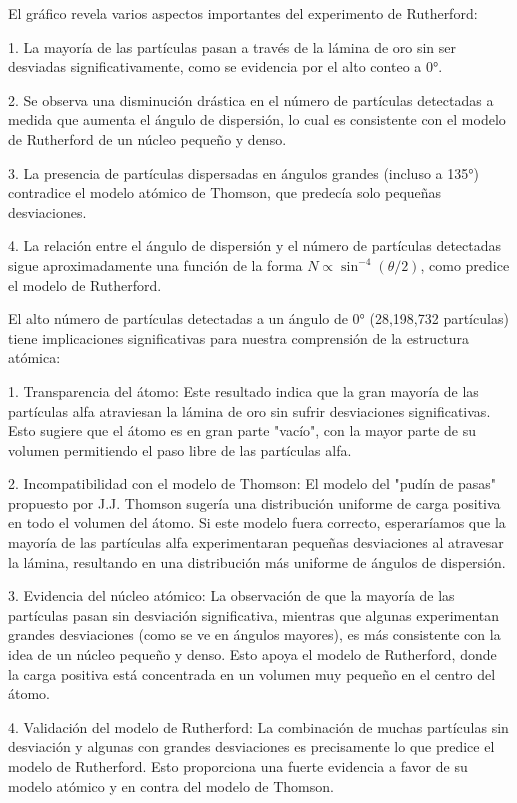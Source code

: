 \documentclass[twocolumn,a4paper,11pt]{scrartcl}
\begin{document}
El gráfico revela varios aspectos importantes del experimento de Rutherford:

1. La mayoría de las partículas pasan a través de la lámina de oro sin ser desviadas significativamente, como se evidencia por el alto conteo a 0°.

2. Se observa una disminución drástica en el número de partículas detectadas a medida que aumenta el ángulo de dispersión, lo cual es consistente con el modelo de Rutherford de un núcleo pequeño y denso.

3. La presencia de partículas dispersadas en ángulos grandes (incluso a 135°) contradice el modelo atómico de Thomson, que predecía solo pequeñas desviaciones.

4. La relación entre el ángulo de dispersión y el número de partículas detectadas sigue aproximadamente una función de la forma $N \propto \sin^{-4}(\theta/2)$, como predice el modelo de Rutherford.

El alto número de partículas detectadas a un ángulo de 0° (28,198,732 partículas) tiene implicaciones significativas para nuestra comprensión de la estructura atómica:

1. Transparencia del átomo: Este resultado indica que la gran mayoría de las partículas alfa atraviesan la lámina de oro sin sufrir desviaciones significativas. Esto sugiere que el átomo es en gran parte "vacío", con la mayor parte de su volumen permitiendo el paso libre de las partículas alfa.

2. Incompatibilidad con el modelo de Thomson: El modelo del "pudín de pasas" propuesto por J.J. Thomson sugería una distribución uniforme de carga positiva en todo el volumen del átomo. Si este modelo fuera correcto, esperaríamos que la mayoría de las partículas alfa experimentaran pequeñas desviaciones al atravesar la lámina, resultando en una distribución más uniforme de ángulos de dispersión.

3. Evidencia del núcleo atómico: La observación de que la mayoría de las partículas pasan sin desviación significativa, mientras que algunas experimentan grandes desviaciones (como se ve en ángulos mayores), es más consistente con la idea de un núcleo pequeño y denso. Esto apoya el modelo de Rutherford, donde la carga positiva está concentrada en un volumen muy pequeño en el centro del átomo.

4. Validación del modelo de Rutherford: La combinación de muchas partículas sin desviación y algunas con grandes desviaciones es precisamente lo que predice el modelo de Rutherford. Esto proporciona una fuerte evidencia a favor de su modelo atómico y en contra del modelo de Thomson.
\end{document}

